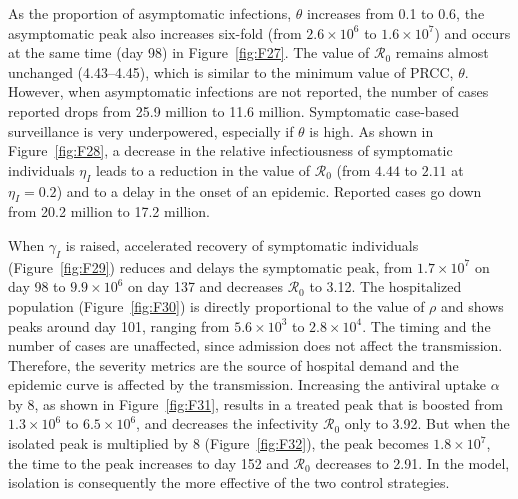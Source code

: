 \documentclass[12pt,a4paper]{article}
\theoremstyle{definition}
\theoremstyle{remark}
\begin{document}
As the proportion of asymptomatic infections, $\theta$ increases from 0.1 to 0.6, the asymptomatic peak also increases six-fold (from $2.6\times10^{6}$ to $1.6\times10^{7}$) and occurs at the same time (day 98) in Figure~\ref{fig:F27}. The value of $\mathcal{R}_0$ remains almost unchanged (4.43--4.45), which is similar to the minimum value of PRCC, $\theta$. However, when asymptomatic infections are not reported, the number of cases reported drops from 25.9 million to 11.6 million. Symptomatic case-based surveillance is very underpowered, especially if $\theta$ is high. As shown in Figure~\ref{fig:F28}, a decrease in the relative infectiousness of symptomatic individuals $\eta_I$ leads to a reduction in the value of $\mathcal{R}_0$ (from $4.44$ to $2.11$ at $\eta_I=0.2$) and to a delay in the onset of an epidemic. Reported cases go down from 20.2 million to 17.2 million.


When $\gamma_I$ is raised, accelerated recovery of symptomatic individuals (Figure~\ref{fig:F29}) reduces and delays the symptomatic peak, from $1.7\times10^{7}$ on day 98 to $9.9\times10^{6}$ on day 137 and decreases $\mathcal{R}_0$ to 3.12. The hospitalized population (Figure~\ref{fig:F30}) is directly proportional to the value of $\rho$ and shows peaks around day 101, ranging from $5.6\times10^{3}$ to $2.8\times10^{4}$. The timing and the number of cases are unaffected, since admission does not affect the transmission. Therefore, the severity metrics are the source of hospital demand and the epidemic curve is affected by the transmission. Increasing the antiviral uptake $\alpha$ by 8, as shown in Figure~\ref{fig:F31}, results in a treated peak that is boosted from $1.3\times10^{6}$ to $6.5\times10^{6}$, and decreases the infectivity $\mathcal{R}_0$ only to 3.92. But when the isolated peak is multiplied by 8 (Figure~\ref{fig:F32}), the peak becomes $1.8\times 10^{7}$, the time to the peak increases to day 152 and $\mathcal{R}_0$ decreases to 2.91. In the model, isolation is consequently the more effective of the two control strategies.
\end{document}
